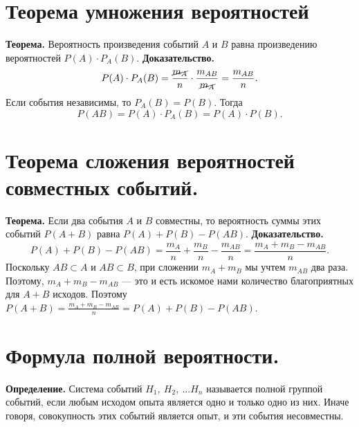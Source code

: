 \documentclass[a4paper,11pt,oneside]{article}
\begin{document}
\section{Теорема умножения вероятностей}
\textbf{Теорема.} Вероятность произведения событий $A$ и $B$ равна произведению вероятностей $P(A) \cdot P_{A}(B)$.\newline
\textbf{Доказательство.}
\[
  P(A) \cdot P_{A}(B) = \frac{\cancel{m_{A}}}{n} \cdot \frac{m_{AB}}{\cancel{m_{A}}} = \frac{m_{AB}}{n}.
\]
Если события независимы, то $P_{A}(B) = P(B)$. Тогда
\[
  P(AB) = P(A) \cdot P_{A}(B) = P(A) \cdot P(B).
\]
\section{Теорема сложения вероятностей совместных событий.}
\textbf{Теорема.} Если два события $A$ и $B$ совместны, то вероятность суммы этих событий $P(A + B)$ равна $P(A) + P(B) - P(AB)$.\newline
\textbf{Доказательство.}
\[
  P(A) + P(B) - P(AB) =
  \frac{m_{A}}{n} + \frac{m_{B}}{n} - \frac{m_{AB}}{n} =
  \frac{m_{A} + m_{B} - m_{AB}}{n}.
\]
Поскольку $AB \subset A$ и $AB \subset B$, при сложении $m_{A} + m_{B}$ мы учтем $m_{AB}$ два раза. Поэтому, $m_{A} + m_{B} - m_{AB}$ --- это и есть искомое нами количество благоприятных для $A + B$ исходов. Поэтому $P(A+B) = \frac{m_{A} + m_{B} - m_{AB}}{n} = P(A) + P(B) - P(AB)$.
\section{Формула полной вероятности.}
\textbf{Определение.} Система событий $H_{1},\ H_{2},\ ... H_{n}$ называется полной группой событий, если любым исходом опыта является одно и только одно из них. Иначе говоря, совокупность этих событий является опыт, и эти события несовместны.
\end{document}
